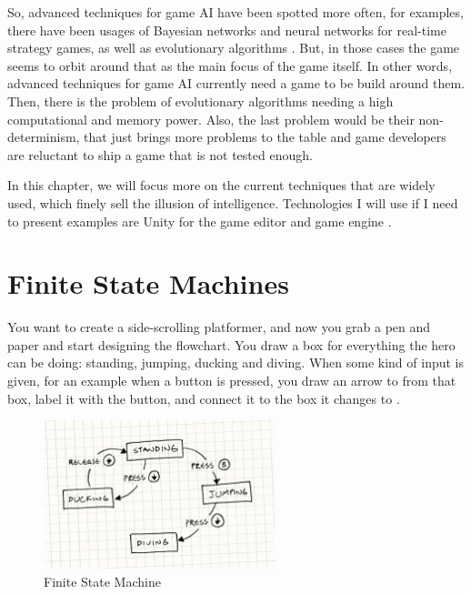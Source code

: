 \documentclass[a4paper, 12pt]{book}
\begin{document}
So, advanced techniques for game AI have been spotted more often, for examples, there have been usages of Bayesian networks and neural networks for real-time strategy games, as well as evolutionary algorithms \cite{FuzzyAIGames}. But, in those cases the game seems to orbit around that as the main focus of the game itself. In other words, advanced techniques for game AI currently need a game to be build around them. Then, there is the problem of evolutionary algorithms needing a high computational and memory power. Also, the last problem would be their non-determinism, that just brings more problems to the table and game developers are reluctant to ship a game that is not tested enough.

In this chapter, we will focus more on the current techniques that are widely used, which finely sell the illusion of intelligence. Technologies I will use if I need to present examples are Unity for the game editor and game engine \cite{UnitySoftware}.

\section{Finite State Machines}

You want to create a side-scrolling platformer, and now you grab a pen and paper and start designing the flowchart. You draw a box for everything the hero can be doing: standing, jumping, ducking and diving. When some kind of input is given, for an example when a button is pressed, you draw an arrow to from that box, label it with the button, and connect it to the box it changes to \cite{GameProgrammingPattersFMS}.

\begin{figure}[h]
\begin{center}
\includegraphics[width=0.6\textwidth]{Images/state_FSM.png}
\end{center}
\caption{Finite State Machine}
\label{pic1}
\end{figure}
\end{document}
